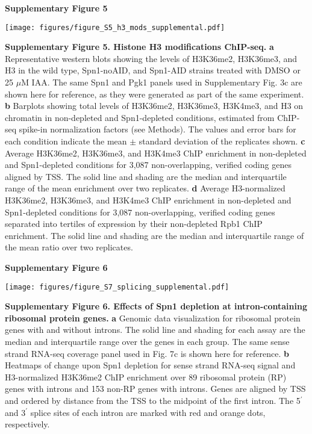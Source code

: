 \documentclass[8pt]{extarticle}
\begin{document}
\newpage

\textbf{\large Supplementary Figure 5}

{\texttt{[image: figures/figure\_S5\_h3\_mods\_supplemental.pdf]}\par}

\vspace{2em}
\textbf{Supplementary Figure 5. Histone H3 modifications ChIP-seq.}
\textbf{a} Representative western blots showing the levels of H3K36me2, H3K36me3, and H3 in the wild type, Spn1-noAID, and Spn1-AID strains treated with DMSO or 25 $\mu$M IAA.
The same Spn1 and Pgk1 panels used in Supplementary Fig. 3c are shown here for reference, as they were generated as part of the same experiment.
\textbf{b} Barplots showing total levels of H3K36me2, H3K36me3, H3K4me3, and H3 on chromatin in non-depleted and Spn1-depleted conditions, estimated from ChIP-seq spike-in normalization factors (see Methods).
The values and error bars for each condition indicate the mean $\pm$ standard deviation of the replicates shown.
\textbf{c} Average H3K36me2, H3K36me3, and H3K4me3 ChIP enrichment in non-depleted and Spn1-depleted conditions for 3,087 non-overlapping, verified coding genes aligned by TSS.
The solid line and shading are the median and interquartile range of the mean enrichment over two replicates.
\textbf{d} Average H3-normalized H3K36me2, H3K36me3, and H3K4me3 ChIP enrichment in non-depleted and Spn1-depleted conditions for 3,087 non-overlapping, verified coding genes separated into tertiles of expression by their non-depleted Rpb1 ChIP enrichment.
The solid line and shading are the median and interquartile range of the mean ratio over two replicates.

\newpage




\textbf{\large Supplementary Figure 6}

{\texttt{[image: figures/figure\_S7\_splicing\_supplemental.pdf]}\par}

\vspace{2em}
\textbf{Supplementary Figure 6. Effects of Spn1 depletion at intron-containing ribosomal protein genes.}
\textbf{a} Genomic data visualization for ribosomal protein genes with and without introns.
The solid line and shading for each assay are the median and interquartile range over the genes in each group.
The same sense strand RNA-seq coverage panel used in Fig. 7c is shown here for reference.
\textbf{b} Heatmaps of change upon Spn1 depletion for sense strand RNA-seq signal and H3-normalized H3K36me2 ChIP enrichment over 89 ribosomal protein (RP) genes with introns and 153 non-RP genes with introns.
Genes are aligned by TSS and ordered by distance from the TSS to the midpoint of the first intron.
The 5$^\prime$ and 3$^\prime$ splice sites of each intron are marked with red and orange dots, respectively.

\newpage
\end{document}
